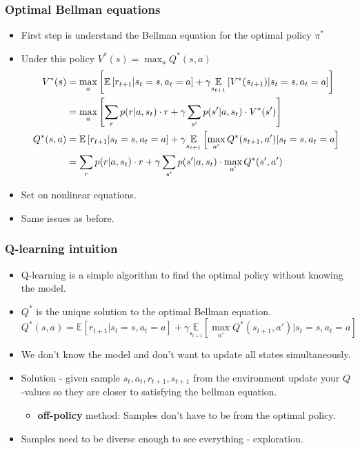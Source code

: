 \documentclass{beamer}
\renewcommand{\high}{\textbf}
\begin{document}
\begin{frame}\frametitle{Optimal Bellman equations}\small
\begin{itemize}
    \item First step is understand the Bellman equation for the optimal policy $\pi^*$
    \item Under this policy $V^*(s)=\max_a Q^*(s,a)$
        {\footnotesize
        \begin{align*}\footnotesize
        V^*(s)& = \max_a\left[\mathbb{E}\left[r_{t+1} |s_t=s,a_t=a\right] +\gamma \underset{s_{t+1}}{\mathbb{E}}\left[V^{*}(s_{t+1})|s_t=s,a_t=a\right]\right] \\
        &= \max_a\left[\sum_{r}p(r|a,s_t)\cdot r+\gamma \sum_{s'}p(s'|a,s_t)\cdot V^*(s')\right] \\
        Q^*(s,a)&=\mathbb{E}\left[r_{t+1} |s_t=s,a_t=a\right]+ \gamma\underset{s_{t+1}}{\mathbb{E}}\left[\max_{a'}Q^{*}(s_{t+1},a')|s_t=s,a_t=a\right] \\
        &= \sum_{r}p(r|a,s_t)\cdot r+\gamma \sum_{s'}p(s'|a,s_t)\cdot\max_{a'} Q^*(s',a')
        \end{align*}}
     \item Set on nonlinear equations.
     \item Same issues as before.
\end{itemize}
\end{frame}


\begin{frame}\frametitle{Q-learning intuition}\small
\begin{itemize}
    \item Q-learning is a simple algorithm to find the optimal policy without knowing the model.
        \item $Q^*$ is the unique solution to the optimal Bellman equation.
    \[
    Q^*(s,a)=\mathbb{E}\left[r_{t+1} |s_t=s,a_t=a\right]+ \gamma\underset{s_{t+1}}{\mathbb{E}}\left[\max_{a'}Q^{*}(s_{t+1},a')|s_t=s,a_t=a\right]
    \]
    \item We don't know the model and don't want to update all states simultaneously.
    \item Solution - given sample $s_t,a_t,r_{t+1},s_{t+1}$ from the environment update your $Q$-values so they are closer to satisfying the bellman equation.
    \begin{itemize}
        \item \high{off-policy} method: Samples don't have to be from the optimal policy.
    \end{itemize} 
    \item Samples need to be diverse enough to see everything - exploration.
\end{itemize}
\end{frame}
\end{document}
